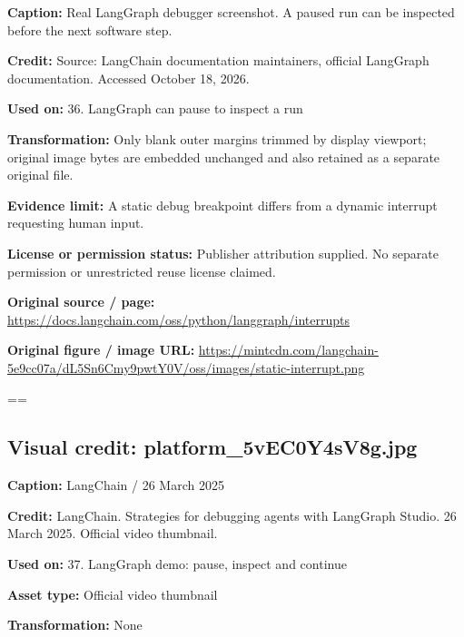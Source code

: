 \documentclass[10pt,letterpaper]{article}
\begin{document}
\textbf{Caption:} Real LangGraph debugger screenshot. A paused run can be inspected before the next software step.\par
\textbf{Credit:} Source: LangChain documentation maintainers, official LangGraph documentation. Accessed October 18, 2026.\par
\textbf{Used on:} 36. LangGraph can pause to inspect a run\par
\textbf{Transformation:} Only blank outer margins trimmed by display viewport; original image bytes are embedded unchanged and also retained as a separate original file.\par
\textbf{Evidence limit:} A static debug breakpoint differs from a dynamic interrupt requesting human input.\par
\textbf{License or permission status:} Publisher attribution supplied. No separate permission or unrestricted reuse license claimed.\par
\textbf{Original source / page:} \href{https://docs.langchain.com/oss/python/langgraph/interrupts}{\small\ttfamily https:/\allowbreak{}/\allowbreak{}docs.\allowbreak{}langchain.\allowbreak{}com/\allowbreak{}oss/\allowbreak{}python/\allowbreak{}langgraph/\allowbreak{}interrupts}\par
\textbf{Original figure / image URL:} \href{https://mintcdn.com/langchain-5e9cc07a/dL5Sn6Cmy9pwtY0V/oss/images/static-interrupt.png}{\small\ttfamily https:/\allowbreak{}/\allowbreak{}mintcdn.\allowbreak{}com/\allowbreak{}langchain-\allowbreak{}5e9cc07a/\allowbreak{}dL5Sn6Cmy9pwtY0V/\allowbreak{}oss/\allowbreak{}images/\allowbreak{}static-\allowbreak{}interrupt.\allowbreak{}png}\par
\egroup\par\noindent\box\readingEntry\par\medskip
\setbox\readingEntry=\vbox\bgroup\hsize=\linewidth\subsection*{Visual credit: platform\_5vEC0Y4sV8g.jpg}
\textbf{Caption:} LangChain / 26 March 2025\par
\textbf{Credit:} LangChain. Strategies for debugging agents with LangGraph Studio. 26 March 2025. Official video thumbnail.\par
\textbf{Used on:} 37. LangGraph demo: pause, inspect and continue\par
\textbf{Asset type:} Official video thumbnail\par
\textbf{Transformation:} None\par
\end{document}
